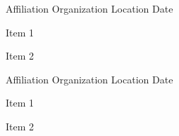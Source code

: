 
\begin{cventries}

  \cventry
    {Affiliation} %
    {Organization} %
    {Location} %
    {Date} %
    {
      \begin{cvitems} %
        \item {Item 1}
        \item {Item 2}
      \end{cvitems}
    }

  \cventry
    {Affiliation} %
    {Organization} %
    {Location} %
    {Date} %
    {
      \begin{cvitems} %
        \item {Item 1}
        \item {Item 2}
      \end{cvitems}
    }

\end{cventries}
